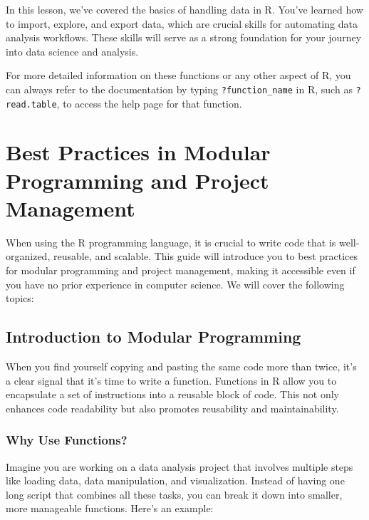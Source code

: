 \documentclass[
]{book}
\begin{document}
In this lesson, we've covered the basics of handling data in R. You've learned how to import, explore, and export data, which are crucial skills for automating data analysis workflows. These skills will serve as a strong foundation for your journey into data science and analysis.

For more detailed information on these functions or any other aspect of R, you can always refer to the documentation by typing \texttt{?function\_name} in R, such as \texttt{?read.table}, to access the help page for that function.

\hypertarget{best-practices-in-modular-programming-and-project-management}{%
\section{Best Practices in Modular Programming and Project Management}\label{best-practices-in-modular-programming-and-project-management}}

When using the R programming language, it is crucial to write code that is well-organized, reusable, and scalable. This guide will introduce you to best practices for modular programming and project management, making it accessible even if you have no prior experience in computer science. We will cover the following topics:

\hypertarget{introduction-to-modular-programming}{%
\subsection{Introduction to Modular Programming}\label{introduction-to-modular-programming}}

When you find yourself copying and pasting the same code more than twice, it's a clear signal that it's time to write a function. Functions in R allow you to encapsulate a set of instructions into a reusable block of code. This not only enhances code readability but also promotes reusability and maintainability.

\hypertarget{why-use-functions}{%
\subsubsection{Why Use Functions?}\label{why-use-functions}}

Imagine you are working on a data analysis project that involves multiple steps like loading data, data manipulation, and visualization. Instead of having one long script that combines all these tasks, you can break it down into smaller, more manageable functions. Here's an example:
\end{document}
